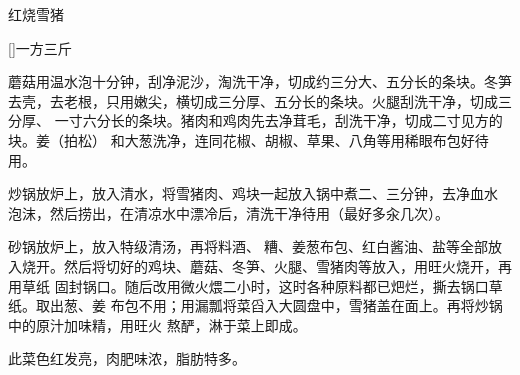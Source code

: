\begin{recipe}{红烧雪猪}

\ingredients

[\footnotemark]{一方三斤}

\preparation

\step 蘑菇用温水泡十分钟，刮净泥沙，淘洗干净，切成约三分大、五分长的条块。冬笋
去壳，去老根，只用嫩尖，横切成三分厚、五分长的条块。火腿刮洗干净，切成三分厚、
一寸六分长的条块。猪肉和鸡肉先去净茸毛，刮洗干净，切成二寸见方的块。姜（拍松）
和大葱洗净，连同花椒、胡椒、草果、八角等用稀眼布包好待用。

\step 炒锅放炉上，放入清水，将雪猪肉、鸡块一起放入锅中煮二、三分钟，去净血水
泡沫，然后捞出，在清凉水中漂冷后，清洗干净待用（最好多汆几次）。

\step 砂锅放炉上，放入特级清汤，再将料酒、𰪿糟、姜葱布包、红白酱油、盐等全部放
入烧开。然后将切好的鸡块、蘑菇、冬笋、火腿、雪猪肉等放入，用旺火烧开，再用草纸
固封锅口。随后改用微火煨二小时，这时各种原料都已𤆵烂，撕去锅口草纸。取出葱、姜
布包不用；用漏瓢将菜舀入大圆盘中，雪猪盖在面上。再将炒锅中的原汁加味精，用旺火
熬酽，淋于菜上即成。

\features

此菜色红发亮，肉肥味浓，脂肪特多。


\end{recipe}

